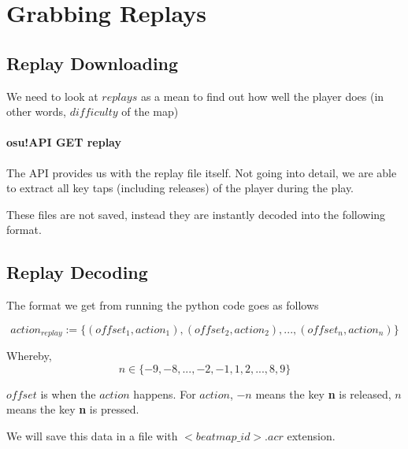 

\section{Grabbing Replays}

\subsection{Replay Downloading}

We need to look at $replays$ as a mean to find out how well the player does (in other words, $difficulty$ of the map)

\paragraph{osu!API GET replay} The API provides us with the replay file itself. Not going into detail, we are able to extract all key taps (including releases) of the player during the play.

These files are not saved, instead they are instantly decoded into the following format.

\subsection{Replay Decoding}

The format we get from running the python code goes as follows

$$ action_{replay} := \lbrace(offset_1, action_1), (offset_2, action_2), ... , (offset_n, action_n)\rbrace $$

Whereby, 
$$n \in \lbrace-9, -8, ... , -2, -1, 1, 2, ... , 8, 9\rbrace$$

$offset$ is when the $action$ happens. For $action$, $-n$ means the key \textbf{n} is released, $n$ means the key \textbf{n} is pressed.

We will save this data in a file with $<beatmap\_id>.acr$ extension.


